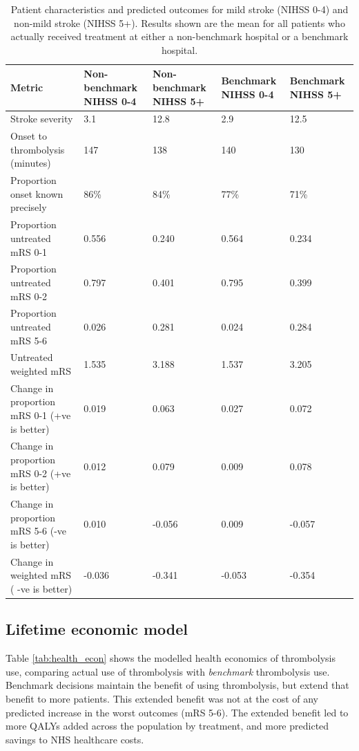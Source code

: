 \begin{minipage}{1\textwidth}
\small
\renewcommand{\arraystretch}{1.2}
\begin{longtable}{p{7.2cm} | p{1.6cm} p{1.6cm} | p{1.6cm} p{1.6cm}}
\caption{Patient characteristics and predicted outcomes for mild stroke (NIHSS 0-4) and non-mild stroke (NIHSS 5+). Results shown are the mean for all patients who actually received treatment at either a non-benchmark hospital or a benchmark hospital.}\\
\label{tab:mild_stroke}

Metric & Non-benchmark NIHSS 0-4 & Non-benchmark NIHSS 5+ & Benchmark NIHSS 0-4 & Benchmark NIHSS 5+\\
\endhead
\midrule
Stroke severity & 3.1 & 12.8 & 2.9 & 12.5\\
Onset to thrombolysis (minutes) & 147 & 138 & 140 & 130\\
Proportion onset known precisely & 86\% & 84\% & 77\% & 71\%\\
Proportion untreated mRS 0-1 & 0.556 & 0.240 & 0.564 & 0.234\\
Proportion untreated mRS 0-2 & 0.797 & 0.401 & 0.795 & 0.399\\
Proportion untreated mRS 5-6 & 0.026 & 0.281 & 0.024 & 0.284\\
Untreated weighted mRS & 1.535 & 3.188 & 1.537 & 3.205\\
Change in proportion mRS 0-1 (+ve is better) & 0.019 & 0.063 & 0.027 & 0.072\\
Change in proportion mRS 0-2 (+ve is better) & 0.012 & 0.079 & 0.009 & 0.078\\
Change in proportion mRS 5-6 (-ve is better) & 0.010 & -0.056 & 0.009 & -0.057\\
Change in weighted mRS ( -ve is better) & -0.036 & -0.341 & -0.053 & -0.354\\

\end{longtable}
\normalsize
\end{minipage}


\subsection{Lifetime economic model}

Table \ref{tab:health_econ} shows the modelled health economics of thrombolysis use, comparing actual use of thrombolysis with \textit{benchmark} thrombolysis use. Benchmark decisions maintain the benefit of using thrombolysis, but extend that benefit to more patients. This extended benefit was not at the cost of any predicted increase in the worst outcomes (mRS 5-6). The extended benefit led to more QALYs added across the population by treatment, and more predicted savings to NHS healthcare costs.

